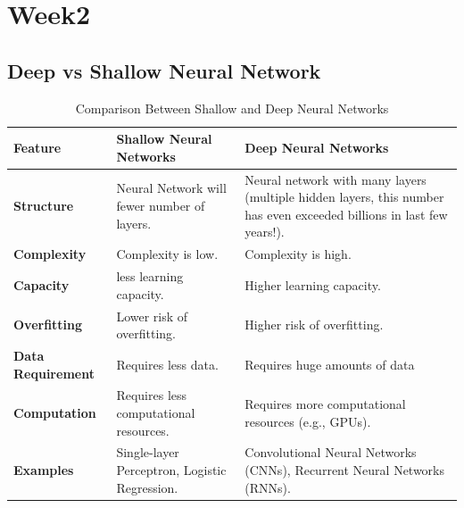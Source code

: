 \documentclass[12pt]{article}
\begin{document}
\section{Week2}
\subsection{Deep vs Shallow Neural Network}
\begin{table}[H]
\centering
\caption{Comparison Between Shallow and Deep Neural Networks}
\label{tab:nn_comparison}
\vspace{0.5em}
\begin{tabular}{lp{6cm}p{6cm}}
\toprule
\textbf{Feature} & \textbf{Shallow Neural Networks} & \textbf{Deep Neural Networks} \\ \midrule
\textbf{Structure} & Neural Network will fewer number of layers. & Neural network with many layers (multiple hidden layers, this number has even exceeded billions in last few years!). \\ \addlinespace
\textbf{Complexity} & Complexity is low. & Complexity is high. \\ \addlinespace
\textbf{Capacity} & less learning capacity. & Higher learning capacity. \\ \addlinespace
\textbf{Overfitting} & Lower risk of overfitting. & Higher risk of overfitting. \\ \addlinespace
\textbf{Data Requirement} & Requires less data. & Requires huge amounts of data \\ \addlinespace
\textbf{Computation} & Requires less computational resources. & Requires more computational resources (e.g., GPUs). \\ \addlinespace
\textbf{Examples} & Single-layer Perceptron, Logistic Regression. & Convolutional Neural Networks (CNNs), Recurrent Neural Networks (RNNs). \\ \bottomrule
\end{tabular}
\end{table}
\end{document}
